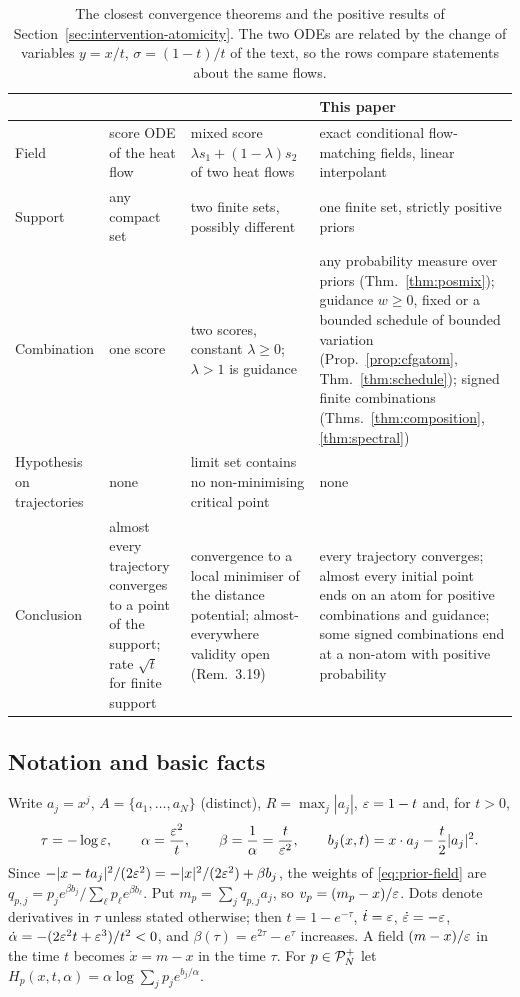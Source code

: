 \documentclass{article} %
\theoremstyle{plain}
\theoremstyle{definition}
\theoremstyle{remark}
\begin{document}
\begin{table}[htb]
\centering\footnotesize\setlength{\tabcolsep}{3pt}
\begin{tabular}{@{}p{}p{}p{}p{}@{}}
\toprule
& \citet[Thm.~3.7]{liu2025pde} & \citet[Thm.~3.18]{liu2026geometric} & This paper\\
\midrule
Field & score ODE of the heat flow & mixed score $\lambda s_1+(1-\lambda)s_2$ of two heat flows & exact conditional flow-matching fields, linear interpolant\\
Support & any compact set & two finite sets, possibly different & one finite set, strictly positive priors\\
Combination & one score & two scores, constant $\lambda\ge0$; $\lambda>1$ is guidance & any probability measure over priors (Thm.~\ref{thm:posmix}); guidance $w\ge0$, fixed or a bounded schedule of bounded variation (Prop.~\ref{prop:cfgatom}, Thm.~\ref{thm:schedule}); signed finite combinations (Thms.~\ref{thm:composition}, \ref{thm:spectral})\\
Hypothesis on trajectories & none & limit set contains no non-minimising critical point & none\\
Conclusion & almost every trajectory converges to a point of the support; rate $\sqrt t$ for finite support & convergence to a local minimiser of the distance potential; almost-everywhere validity open (Rem.~3.19) & every trajectory converges; almost every initial point ends on an atom for positive combinations and guidance; some signed combinations end at a non-atom with positive probability\\
\bottomrule
\end{tabular}
\caption{The closest convergence theorems and the positive results of
Section~\ref{sec:intervention-atomicity}. The two ODEs are related by the change of variables
$y=x/t$, $\sigma=(1-t)/t$ of the text, so the rows compare statements about the same flows.}
\label{tab:comparison}
\end{table}

\subsection{Notation and basic facts}
\label{apx:intervention-notation}

Write $a_j=x^j$, $A=\{a_1,\dots,a_N\}$ (distinct), $R=\max_j|a_j|$, $\varepsilon=1-t$ and, for $t>0$,
\[
\tau=-\log\varepsilon,\qquad \alpha=\frac{\varepsilon^2}{t},\qquad \beta=\frac1\alpha=\frac{t}{\varepsilon^2},
\qquad b_j(x,t)=x\cdot a_j-\frac t2|a_j|^2 .
\]
Since $-|x-ta_j|^2/(2\varepsilon^2)=-|x|^2/(2\varepsilon^2)+\beta b_j$, the weights of \eqref{eq:prior-field}
are $q_{p,j}=p_je^{\beta b_j}/\sum_\ell p_\ell e^{\beta b_\ell}$. Put $m_p=\sum_jq_{p,j}a_j$, so
$v_p=(m_p-x)/\varepsilon$. Dots denote derivatives in $\tau$ unless stated otherwise; then
$t=1-e^{-\tau}$, $\dot t=\varepsilon$, $\dot{\varepsilon}=-\varepsilon$, $\dot\alpha=-(2\varepsilon^2t+\varepsilon^3)/t^2<0$, and
$\beta(\tau)=e^{2\tau}-e^\tau$ increases. A field $(m-x)/\varepsilon$ in the time $t$ becomes
$\dot x=m-x$ in the time $\tau$. For $p\in\mathcal{P}_N^{+}$ let $H_p(x,t,\alpha)=\alpha\log\sum_jp_je^{b_j/\alpha}$.
\end{document}
